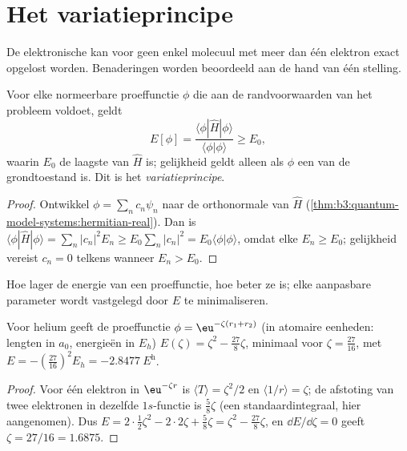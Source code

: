 \section{Het variatieprincipe}

De elektronische  kan voor geen enkel molecuul met
meer dan één elektron exact opgelost worden. Benaderingen worden
beoordeeld aan de hand van één stelling.

\begin{theorem}\label{thm:b3:computational-chemistry:variational}
Voor elke normeerbare proeffunctie $\phi$ die aan de randvoorwaarden van
het probleem voldoet, geldt
\[
E[\phi] = \frac{\langle\phi|\hat H|\phi\rangle}{\langle\phi|\phi\rangle} \ge E_0,
\]
waarin $E_0$ de laagste  van $\hat H$ is; gelijkheid geldt alleen
als $\phi$ een  van de grondtoestand is. Dit is het
\emph{variatieprincipe}.
\end{theorem}

\begin{proof}
Ontwikkel $\phi = \sum_nc_n\psi_n$ naar de orthonormale  van $\hat H$
(\cref{thm:b3:quantum-model-systems:hermitian-real}). Dan is $\langle\phi|\hat
H|\phi\rangle = \sum_n|c_n|^2E_n \ge E_0\sum_n|c_n|^2 = E_0\langle\phi|\phi\rangle$,
omdat elke $E_n \ge E_0$; gelijkheid vereist $c_n = 0$ telkens wanneer $E_n > E_0$.
\end{proof}

Hoe lager de energie van een proeffunctie, hoe beter ze is; elke
aanpasbare parameter wordt vastgelegd door $E$ te minimaliseren.

\begin{proposition}\label{prop:b3:computational-chemistry:helium-zeta}
Voor helium geeft de proeffunctie $\phi = \eu^{-\zeta(r_1 + r_2)}$ (in atomaire
eenheden: lengten in $a_0$, energieën in $E_h$) $E(\zeta) = \zeta^2 - \frac{27}{8}\zeta$,
minimaal voor $\zeta = \frac{27}{16}$, met $E = -(\frac{27}{16})^2 E_h =
\qty{-2.8477}{\hartree}$.
\end{proposition}

\begin{proof}
Voor één elektron in $\eu^{-\zeta r}$ is $\langle T\rangle = \zeta^2/2$ en
$\langle 1/r\rangle = \zeta$; de afstoting van twee elektronen in dezelfde
$1s$-functie is $\frac58\zeta$ (een standaardintegraal, hier aangenomen).
Dus $E = 2\cdot\frac12
\zeta^2 - 2\cdot2\zeta + \frac58\zeta = \zeta^2 - \frac{27}{8}\zeta$, en $\dd E/\dd
\zeta = 0$ geeft $\zeta = 27/16 = 1.6875$.
\end{proof}

